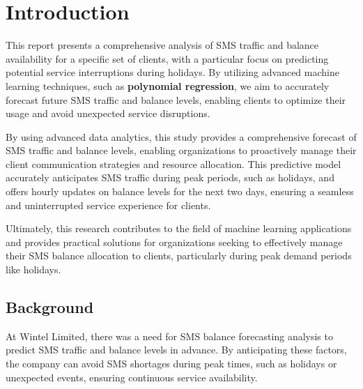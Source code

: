 \documentclass[12pt]{book} %
\begin{document}




\setcounter{page}{1}




\chapter{Introduction}
This report presents a comprehensive analysis of SMS traffic and balance availability for a specific set of clients, with a particular focus on predicting potential service interruptions during holidays. By utilizing advanced machine learning techniques, such as \textbf{polynomial regression}, we aim to accurately forecast future SMS traffic and balance levels, enabling clients to optimize their usage and avoid unexpected service disruptions. 

By using advanced data analytics, this study provides a comprehensive forecast of SMS traffic and balance levels, enabling organizations to proactively manage their client communication strategies and resource allocation. This predictive model accurately anticipates SMS traffic during peak periods, such as holidays, and offers hourly updates on balance levels for the next two days, ensuring a seamless and uninterrupted service experience for clients.

Ultimately, this research contributes to the field of machine learning applications and provides practical solutions for organizations seeking to effectively manage their SMS balance allocation to clients, particularly during peak demand periods like holidays.






\section{Background}
At Wintel Limited, there was a need for SMS balance forecasting analysis to predict SMS traffic and balance levels in advance. By anticipating these factors, the company can avoid SMS shortages during peak times, such as holidays or unexpected events, ensuring continuous service availability.
\end{document}
